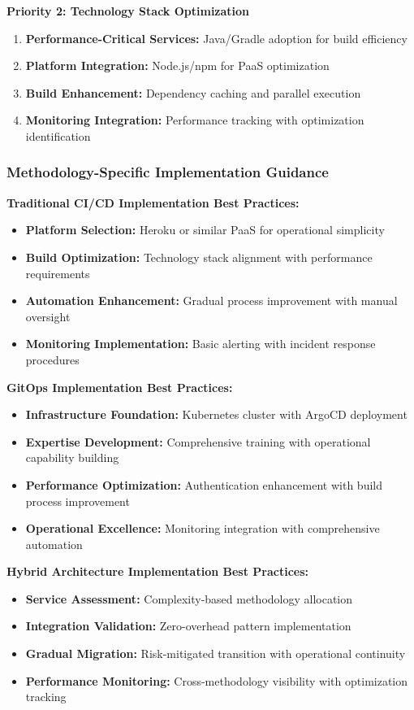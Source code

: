 \textbf{Priority 2: Technology Stack Optimization}
\begin{enumerate}
\item \textbf{Performance-Critical Services:} Java/Gradle adoption for build efficiency
\item \textbf{Platform Integration:} Node.js/npm for PaaS optimization
\item \textbf{Build Enhancement:} Dependency caching and parallel execution
\item \textbf{Monitoring Integration:} Performance tracking with optimization identification
\end{enumerate}

\subsubsection{Methodology-Specific Implementation Guidance}

\textbf{Traditional CI/CD Implementation Best Practices:}
\begin{itemize}
\item \textbf{Platform Selection:} Heroku or similar PaaS for operational simplicity
\item \textbf{Build Optimization:} Technology stack alignment with performance requirements
\item \textbf{Automation Enhancement:} Gradual process improvement with manual oversight
\item \textbf{Monitoring Implementation:} Basic alerting with incident response procedures
\end{itemize}

\textbf{GitOps Implementation Best Practices:}
\begin{itemize}
\item \textbf{Infrastructure Foundation:} Kubernetes cluster with ArgoCD deployment
\item \textbf{Expertise Development:} Comprehensive training with operational capability building
\item \textbf{Performance Optimization:} Authentication enhancement with build process improvement
\item \textbf{Operational Excellence:} Monitoring integration with comprehensive automation
\end{itemize}

\textbf{Hybrid Architecture Implementation Best Practices:}
\begin{itemize}
\item \textbf{Service Assessment:} Complexity-based methodology allocation
\item \textbf{Integration Validation:} Zero-overhead pattern implementation
\item \textbf{Gradual Migration:} Risk-mitigated transition with operational continuity
\item \textbf{Performance Monitoring:} Cross-methodology visibility with optimization tracking
\end{itemize}

